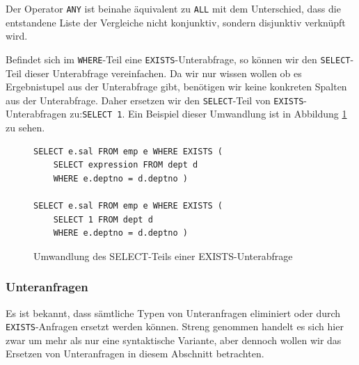 Der Operator \verb|ANY| ist beinahe äquivalent zu \verb|ALL| mit dem Unterschied, dass die entstandene Liste der Vergleiche nicht konjunktiv, sondern disjunktiv verknüpft wird.

Befindet sich im \verb|WHERE|-Teil eine \verb|EXISTS|-Unterabfrage, so können wir den \verb|SELECT|-Teil dieser Unterabfrage vereinfachen. Da wir nur wissen wollen ob es Ergebnistupel aus der Unterabfrage gibt, benötigen wir keine konkreten Spalten aus der Unterabfrage. Daher ersetzen wir den \verb|SELECT|-Teil von \verb|EXISTS|-Unterabfragen zu:\verb|SELECT 1|. Ein Beispiel dieser Umwandlung ist in Abbildung \ref{fig:exists_ex1} zu sehen.

\begin{figure}[H]
\begin{verbatim}
SELECT e.sal FROM emp e WHERE EXISTS (
    SELECT expression FROM dept d 
    WHERE e.deptno = d.deptno )
    
SELECT e.sal FROM emp e WHERE EXISTS (
    SELECT 1 FROM dept d 
    WHERE e.deptno = d.deptno )
\end{verbatim}
\caption{Umwandlung des SELECT-Teils einer EXISTS-Unterabfrage}
\label{fig:exists_ex1}
\end{figure}



\subsubsection*{Unteranfragen}

Es ist bekannt, dass sämtliche Typen von Unteranfragen eliminiert oder durch \verb|EXISTS|-Anfragen ersetzt werden können. Streng genommen handelt es sich hier zwar um mehr als nur eine syntaktische Variante, aber dennoch wollen wir das Ersetzen von Unteranfragen in diesem Abschnitt betrachten.

